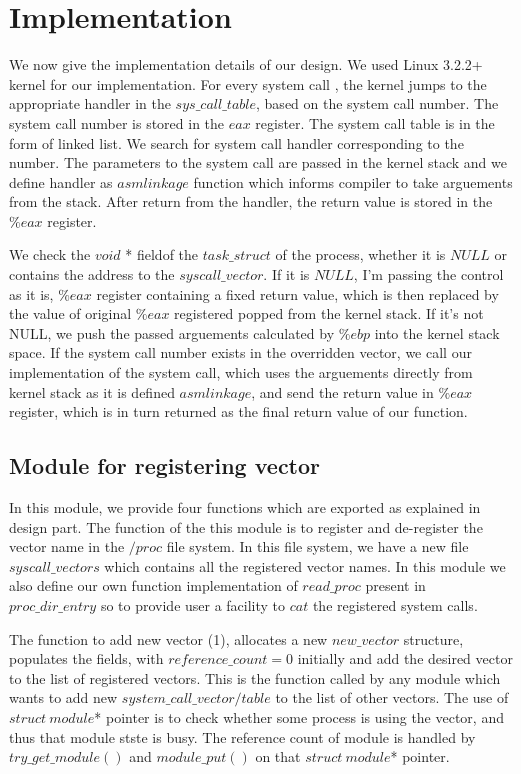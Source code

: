 \documentclass[11pt]{article}
\begin{document}
\section{Implementation}

We now give the implementation details of our design.
We used Linux 3.2.2+ kernel for our implementation. For every system call , the
kernel jumps to the appropriate handler in the $sys\_call\_table$, based on the system call number.
The system call number is stored in the $eax$ register. The system call table is in the form of
linked list. We search for system call handler corresponding to the number. The
parameters to the system call are passed in the kernel stack and we define handler as $asmlinkage$ function which informs compiler to take arguements from the stack. After return from the handler, the return
value is stored in the $\%eax$ register.

We check the $void$ * fieldof the $task\_struct$ of the process, whether it is $NULL$ or contains
the address to the $syscall\_vector$. If it is $NULL$, I'm passing the control as it is,
$\%eax$ register containing a fixed return value, which is then replaced by the value of original $\%eax$ registered popped from the kernel stack. If it's not NULL, we push the passed arguements calculated by $\%ebp$ into the kernel stack space. If the system
call number exists in the overridden vector, we call our implementation of the system call, which uses the arguements directly from
kernel stack as it is defined $asmlinkage$, and send the return value in $\%eax$ register, which is in turn returned as the final
return value of our function.

\subsection{Module for registering vector}

In this module, we provide four functions which are exported as explained in design part. The function of the
this module is to register and de-register the vector name in the $/proc$ file system. In this file
system, we have a new file $syscall\_vectors$ which contains all the registered vector names. In this module
we also define our own function implementation of $read\_proc$ present in $proc\_dir\_entry$ so to provide user a facility to $cat$ the registered system calls. 

The function to add new vector (1), allocates a new $new\_vector$ structure,  populates the fields, with $reference\_count = 0$ 
initially and add the desired vector to the list of registered vectors. This is the function called by any module which wants to add new $system\_call\_vector/table$ to the list of other vectors. The use of $struct \ module$* pointer is to check whether some process is using the vector, and thus that module stste is busy. The reference count of module is handled by $try\_get\_module()$ and $module\_put()$ on that $struct\ module$* pointer.
\end{document}
